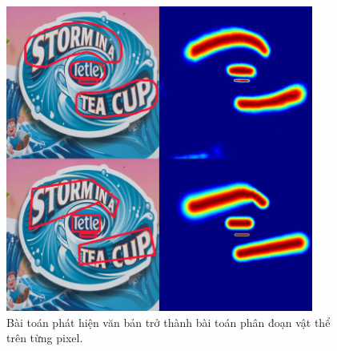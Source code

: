\begin{itemize}
\begin{figure}
\centering
\includegraphics[width=0.9\textwidth]{mep_img/tutorial_segmentation.png}
\caption{Bài toán phát hiện văn bản trở thành bài toán phân đoạn vật thể trên từng pixel.}\label{fig_2.5}
\end{figure}

\end{itemize}

